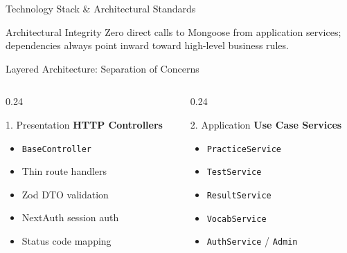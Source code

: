 ﻿\documentclass[aspectratio=169,10pt,t]{beamer}
\begin{document}
\begin{frame}{Technology Stack \& Architectural Standards}
  \vspace{1.2mm}
  \begin{hlCard}{Architectural Integrity}
    Zero direct calls to Mongoose from application services; dependencies always point inward toward high-level business rules.
  \end{hlCard}
\end{frame}

\begin{frame}{Layered Architecture: Separation of Concerns}
  \vspace{0.2mm}
  \begin{columns}[T]
    \begin{column}{0.24\textwidth}
      \begin{infoCard}{1. Presentation}
        \textbf{HTTP Controllers}\\[0.6mm]
        \fontsize{5.8pt}{7.0pt}\selectfont
        \begin{itemize}\setlength{\itemsep}{1pt}\setlength{\parskip}{0pt}\setlength{\leftmargini}{6pt}
          \item \texttt{BaseController}
          \item Thin route handlers
          \item Zod DTO validation
          \item NextAuth session auth
          \item Status code mapping
        \end{itemize}
      \end{infoCard}
    \end{column}

    \begin{column}{0.24\textwidth}
      \begin{infoCard}{2. Application}
        \textbf{Use Case Services}\\[0.6mm]
        \fontsize{5.8pt}{7.0pt}\selectfont
        \begin{itemize}\setlength{\itemsep}{1pt}\setlength{\parskip}{0pt}\setlength{\leftmargini}{6pt}
          \item \texttt{PracticeService}
          \item \texttt{TestService}
          \item \texttt{ResultService}
          \item \texttt{VocabService}
          \item \texttt{AuthService} / \texttt{Admin}
        \end{itemize}
      \end{infoCard}
    \end{column}


\end{columns}
\end{frame}
\end{document}
